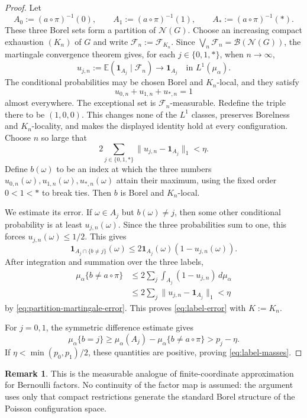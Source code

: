 \documentclass[12pt]{amsart}
\theoremstyle{definition}
\newtheorem{remark}[remark]{Remark}
\newcommand{\cN}{\mathcal N}
\newcommand{\cB}{\mathcal B}
\newcommand{\1}{\mathbf 1}
\begin{document}
\begin{proof}
Let
\[
 A_0:=(a\circ\pi)^{-1}(0),\qquad
 A_1:=(a\circ\pi)^{-1}(1),\qquad
 A_*:=(a\circ\pi)^{-1}(*).
\]
These three Borel sets form a partition of $\cN(G)$. Choose an increasing compact exhaustion $(K_n)$ of $G$ and write $\mathscr F_n:=\mathscr F_{K_n}$. Since $\bigvee_n\mathscr F_n=\cB(\cN(G))$, the martingale convergence theorem gives, for each $j\in\{0,1,*\}$, when $n \to \infty$,
\[
 u_{j,n}:=\mathbb E(\1_{A_j}\mid\mathscr F_n)
 \longrightarrow\1_{A_j}
 \quad\text{in }L^1(\mu_\alpha).
\]
The conditional probabilities may be chosen Borel and $K_n$-local, and they satisfy
\[
 u_{0,n}+u_{1,n}+u_{*,n}=1
\]
almost everywhere. The exceptional set is $\mathscr F_n$-measurable. Redefine the triple there to be $(1,0,0)$. This changes none of the $L^1$ classes, preserves Borelness and $K_n$-locality, and makes the displayed identity hold at every configuration. Choose $n$ so large that
\begin{equation}\label{eq:partition-martingale-error}
 2\sum_{j\in\{0,1,*\}}
 \|u_{j,n}-\1_{A_j}\|_1<\eta.
\end{equation}
Define $b(\omega)$ to be an index at which the three numbers
$u_{0,n}(\omega),u_{1,n}(\omega),u_{*,n}(\omega)$ attain their maximum, using the fixed order $0<1<*$ to break ties. Then $b$ is Borel and $K_n$-local.

We estimate its error. If $\omega\in A_j$ but $b(\omega)\neq j$, then some other conditional probability is at least $u_{j,n}(\omega)$. Since the three probabilities sum to one, this forces $u_{j,n}(\omega)\leq1/2$. This gives
\[
 \1_{A_j\cap\{b\neq j\}}(\omega)
 \leq2\1_{A_j}(\omega)(1-u_{j,n}(\omega)).
\]
After integration and summation over the three labels,
\begin{align*}
 \mu_\alpha\{b\neq a\circ\pi\}
 &\leq2\sum_j\int_{A_j}(1-u_{j,n})\,d\mu_\alpha\\
 &\leq2\sum_j\|u_{j,n}-\1_{A_j}\|_1<\eta
\end{align*}
by \eqref{eq:partition-martingale-error}. This proves \eqref{eq:label-error} with $K:=K_n$.

For $j=0,1$, the symmetric difference estimate gives
\[
 \mu_\alpha\{b=j\}
 \geq\mu_\alpha(A_j)-\mu_\alpha\{b\neq a\circ\pi\}
 >p_j-\eta.
\]
If $\eta<\min(p_0,p_1)/2$, these quantities are positive, proving \eqref{eq:label-masses}.
\end{proof}

\begin{remark}
This is the measurable analogue of finite-coordinate approximation for
Bernoulli factors. No continuity of the factor map is assumed: the argument
uses only that compact restrictions generate the standard Borel structure of
the Poisson configuration space.
\end{remark}
\end{document}
